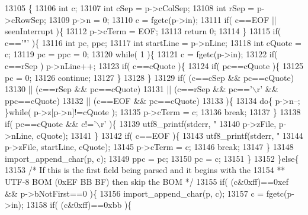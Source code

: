 \begin{DoxyCode}
13105                                                           \{
13106   \textcolor{keywordtype}{int} c;
13107   \textcolor{keywordtype}{int} cSep = p->cColSep;
13108   \textcolor{keywordtype}{int} rSep = p->cRowSep;
13109   p->n = 0;
13110   c = fgetc(p->in);
13111   \textcolor{keywordflow}{if}( c==EOF || seenInterrupt )\{
13112     p->cTerm = EOF;
13113     \textcolor{keywordflow}{return} 0;
13114   \}
13115   \textcolor{keywordflow}{if}( c==\textcolor{charliteral}{'"'} )\{
13116     \textcolor{keywordtype}{int} pc, ppc;
13117     \textcolor{keywordtype}{int} startLine = p->nLine;
13118     \textcolor{keywordtype}{int} cQuote = c;
13119     pc = ppc = 0;
13120     \textcolor{keywordflow}{while}( 1 )\{
13121       c = fgetc(p->in);
13122       \textcolor{keywordflow}{if}( c==rSep ) p->nLine++;
13123       \textcolor{keywordflow}{if}( c==cQuote )\{
13124         \textcolor{keywordflow}{if}( pc==cQuote )\{
13125           pc = 0;
13126           \textcolor{keywordflow}{continue};
13127         \}
13128       \}
13129       \textcolor{keywordflow}{if}( (c==cSep && pc==cQuote)
13130        || (c==rSep && pc==cQuote)
13131        || (c==rSep && pc==\textcolor{charliteral}{'\(\backslash\)r'} && ppc==cQuote)
13132        || (c==EOF && pc==cQuote)
13133       )\{
13134         \textcolor{keywordflow}{do}\{ p->n--; \}\textcolor{keywordflow}{while}( p->z[p->n]!=cQuote );
13135         p->cTerm = c;
13136         \textcolor{keywordflow}{break};
13137       \}
13138       \textcolor{keywordflow}{if}( pc==cQuote && c!=\textcolor{charliteral}{'\(\backslash\)r'} )\{
13139         utf8_printf(stderr, \textcolor{stringliteral}{"%
13140                 p->zFile, p->nLine, cQuote);
13141       \}
13142       \textcolor{keywordflow}{if}( c==EOF )\{
13143         utf8_printf(stderr, \textcolor{stringliteral}{"%
13144                 p->zFile, startLine, cQuote);
13145         p->cTerm = c;
13146         \textcolor{keywordflow}{break};
13147       \}
13148       import_append_char(p, c);
13149       ppc = pc;
13150       pc = c;
13151     \}
13152   \}\textcolor{keywordflow}{else}\{
13153     \textcolor{comment}{/* If this is the first field being parsed and it begins with the}
13154 \textcolor{comment}{    ** UTF-8 BOM  (0xEF BB BF) then skip the BOM */}
13155     \textcolor{keywordflow}{if}( (c&0xff)==0xef && p->bNotFirst==0 )\{
13156       import_append_char(p, c);
13157       c = fgetc(p->in);
13158       \textcolor{keywordflow}{if}( (c&0xff)==0xbb )\{
}}
\end{DoxyCode}
